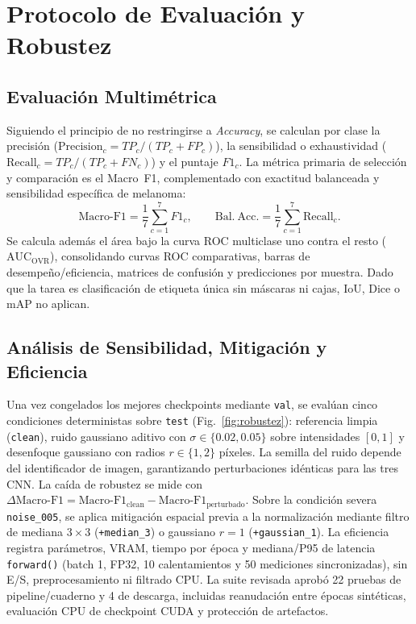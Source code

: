 \documentclass[conference]{IEEEtran}
\begin{document}
\section{Protocolo de Evaluaci\'on y Robustez}

\subsection{Evaluaci\'on Multim\'etrica}
Siguiendo el principio de no restringirse a \textit{Accuracy}, se calculan por clase la precisi\'on ($\mathrm{Precision}_c = TP_c / (TP_c+FP_c)$), la sensibilidad o exhaustividad ($\mathrm{Recall}_c = TP_c / (TP_c+FN_c)$) y el puntaje $F1_c$. La m\'etrica primaria de selecci\'on y comparaci\'on es el Macro~F1, complementado con exactitud balanceada y sensibilidad espec\'ifica de melanoma:
\begin{equation}
\mathrm{Macro\text{-}F1} = \frac{1}{7}\sum_{c=1}^{7} F1_c, \qquad
\mathrm{Bal.\ Acc.} = \frac{1}{7}\sum_{c=1}^{7} \mathrm{Recall}_c.
\end{equation}
Se calcula adem\'as el \'area bajo la curva ROC multiclase uno contra el resto ($\mathrm{AUC}_{\mathrm{OVR}}$), consolidando curvas ROC comparativas, barras de desempe\~no/eficiencia, matrices de confusi\'on y predicciones por muestra. Dado que la tarea es clasificaci\'on de etiqueta \'unica sin m\'ascaras ni cajas, IoU, Dice o mAP no aplican.

\subsection{An\'alisis de Sensibilidad, Mitigaci\'on y Eficiencia}
Una vez congelados los mejores checkpoints mediante \texttt{val}, se eval\'uan cinco condiciones deterministas sobre \texttt{test} (Fig.~\ref{fig:robustez}): referencia limpia (\texttt{clean}), ruido gaussiano aditivo con $\sigma \in \{0.02, 0.05\}$ sobre intensidades $[0,1]$ y desenfoque gaussiano con radios $r \in \{1, 2\}$ p\'ixeles. La semilla del ruido depende del identificador de imagen, garantizando perturbaciones id\'enticas para las tres CNN. La ca\'ida de robustez se mide con $\Delta \mathrm{Macro\text{-}F1} = \mathrm{Macro\text{-}F1}_{\mathrm{clean}} - \mathrm{Macro\text{-}F1}_{\mathrm{perturbado}}$. Sobre la condici\'on severa \texttt{noise\_005}, se aplica mitigaci\'on espacial previa a la normalizaci\'on mediante filtro de mediana $3\times 3$ (\texttt{+median\_3}) o gaussiano $r=1$ (\texttt{+gaussian\_1}). La eficiencia registra par\'ametros, VRAM, tiempo por \'epoca y mediana/P95 de latencia \texttt{forward()} (batch 1, FP32, 10 calentamientos y 50 mediciones sincronizadas), sin E/S, preprocesamiento ni filtrado CPU. La suite revisada aprob\'o 22 pruebas de pipeline/cuaderno y 4 de descarga, incluidas reanudaci\'on entre \'epocas sint\'eticas, evaluaci\'on CPU de checkpoint CUDA y protecci\'on de artefactos.
\end{document}
